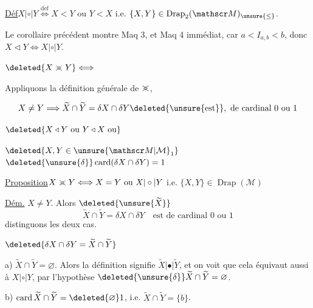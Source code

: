 \uline{Déf}\quad $X|\circ|Y\overset{\mathrm{d\acute ef}}{\Longleftrightarrow}X<Y\text{ ou }Y<X$ i.e. $\{X,Y\}\in\operatorname{Drap}_2(\mathscr M)_{\unsure{\leq}}$.

Le corollaire précédent montre Maq 3, et Maq 4 immédiat, car $a<I_{a,b}<b$, donc $X\triangleleft Y\Longleftrightarrow X|\circ|Y$.


$\deleted{X\mathrel{>\mkern-12mu<}Y}\Longleftrightarrow$

 Appliquons la définition générale de $\mathrel{>\mkern-12mu<}$,


\[
X\ne Y\Longrightarrow\widetilde X\cap\widetilde Y=\delta X\cap\delta Y\deleted{\unsure{\text{est}}},\ \text{de cardinal }0\text{ ou }1
\]

$\deleted{X\triangleleft Y\text{ ou }Y\triangleleft X\text{ ou}}$

$\deleted{X,Y\in\unsure{\mathscr M|\mathcal M}_1}$\quad $\deleted{\unsure{\delta}}\operatorname{card}(\delta X\cap\delta Y)=1$


\uline{Proposition}\quad $X\mathrel{>\mkern-12mu<}Y\Longleftrightarrow X=Y\text{ ou }X|\circ|Y$ i.e. $\{X,Y\}\in\operatorname{Drap}(\mathscr M)$

 \uline{Dém.}\quad {} $X\ne Y$. Alors $\deleted{\unsure{\widetilde X}}$
\[
\widetilde X\cap\widetilde Y=\delta X\cap\delta Y\quad\text{est de cardinal }0\text{ ou }1
\]
distinguons les deux cas.

$\deleted{\delta X\cap\delta Y=\widetilde X\cap\widetilde Y}$

a) $\widetilde X\cap\widetilde Y=\varnothing$. Alors la définition  signifie $\widetilde X|\bullet|\widetilde Y$, et on voit que cela équivaut aussi à $X|\circ|Y$, par l'hypothèse $\deleted{\unsure{\delta}}\widetilde X\cap\widetilde Y=\varnothing$.

b) $\operatorname{card}\widetilde X\cap\widetilde Y=\deleted{\varnothing}1$, i.e. $\widetilde X\cap\widetilde Y=\{b\}$.  

